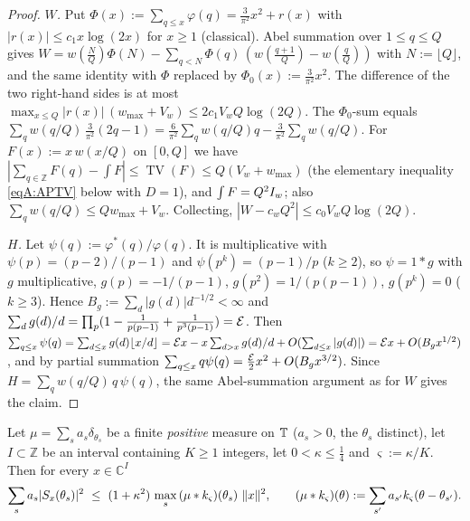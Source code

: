\begin{proof}
\emph{$W$.} Put $\Phi(x):=\sum_{q\le x}\varphi(q)=\frac{3}{\pi^2}x^2+r(x)$ with $|r(x)|\le c_1x\log(2x)$
for $x\ge1$ (classical). Abel summation over $1\le q\le Q$ gives
$W=w(\tfrac{N}Q)\Phi(N)-\sum_{q<N}\Phi(q)\,(w(\tfrac{q+1}Q)-w(\tfrac qQ))$ with $N:=\lfloor Q\rfloor$, and the same identity with
$\Phi$ replaced by $\Phi_0(x):=\frac3{\pi^2}x^2$. The difference of the two right-hand sides is at most
$\max_{x\le Q}|r(x)|\,(w_{\max}+V_w)\le 2c_1V_wQ\log(2Q)$. The $\Phi_0$-sum equals
$\sum_q w(q/Q)\,\frac{3}{\pi^2}(2q-1)=\frac6{\pi^2}\sum_qw(q/Q)q-\frac3{\pi^2}\sum_qw(q/Q)$. For
$F(x):=x\,w(x/Q)$ on $[0,Q]$ we have $|\sum_{q\in\mathbb Z}F(q)-\int F|\le \operatorname{TV}(F)\le Q(V_w+w_{\max})$
(the elementary inequality \eqref{eqA:APTV} below with $D=1$), and $\int F=Q^2I_w$; also $\sum_qw(q/Q)\le Qw_{\max}+V_w$.
Collecting, $|W-c_wQ^2|\le c_0V_wQ\log(2Q)$.

\emph{$H$.} Let $\psi(q):=\varphi^*(q)/\varphi(q)$. It is multiplicative with $\psi(p)=(p-2)/(p-1)$ and
$\psi(p^k)=(p-1)/p$ ($k\ge2$), so $\psi=1*g$ with $g$ multiplicative, $g(p)=-1/(p-1)$,
$g(p^2)=1/(p(p-1))$, $g(p^k)=0$ ($k\ge3$). Hence $B_g:=\sum_d|g(d)|d^{-1/2}<\infty$ and
$\sum_d g(d)/d=\prod_p(1-\frac1{p(p-1)}+\frac1{p^3(p-1)})=\mathcal{E}$. Then
$\sum_{q\le x}\psi(q)=\sum_{d\le x}g(d)\lfloor x/d\rfloor=\mathcal{E} x-x\sum_{d>x}g(d)/d+O(\sum_{d\le x}|g(d)|)
=\mathcal{E} x+O(B_gx^{1/2})$, and by partial summation $\sum_{q\le x}q\psi(q)=\frac{\mathcal{E}}2x^2+O(B_gx^{3/2})$.
Since $H=\sum_qw(q/Q)\,q\,\psi(q)$, the same Abel-summation argument as for $W$ gives the claim.
\end{proof}

\begin{lemma}\label{lem:dual}
Let $\mu=\sum_{s}a_s\delta_{\theta_s}$ be a finite \emph{positive} measure on $\mathbb{T}$ ($a_s>0$, the
$\theta_s$ distinct), let $I\subset\mathbb Z$ be an interval containing $K\ge1$ integers, let
$0<\kappa\le\frac14$ and $\varsigma:=\kappa/K$. Then for every $x\in\mathbb C^{I}$
\[
 \sum_s a_s|S_x(\theta_s)|^2\ \le\ (1+\kappa^2)\,\max_{s}\,(\mu*\Wkd)(\theta_s)\ \|x\|^2,
 \qquad (\mu*\Wkd)(\theta):=\sum_{s'}a_{s'}\Wkd(\theta-\theta_{s'}).
\]
\end{lemma}

